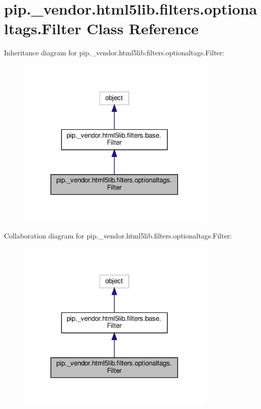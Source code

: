 \hypertarget{classpip_1_1__vendor_1_1html5lib_1_1filters_1_1optionaltags_1_1Filter}{}\section{pip.\+\_\+vendor.\+html5lib.\+filters.\+optionaltags.\+Filter Class Reference}
\label{classpip_1_1__vendor_1_1html5lib_1_1filters_1_1optionaltags_1_1Filter}


Inheritance diagram for pip.\+\_\+vendor.\+html5lib.\+filters.\+optionaltags.\+Filter\+:
\nopagebreak
\begin{figure}[H]
\begin{center}
\leavevmode
\includegraphics[width=269pt]{classpip_1_1__vendor_1_1html5lib_1_1filters_1_1optionaltags_1_1Filter__inherit__graph}
\end{center}
\end{figure}


Collaboration diagram for pip.\+\_\+vendor.\+html5lib.\+filters.\+optionaltags.\+Filter\+:
\nopagebreak
\begin{figure}[H]
\begin{center}
\leavevmode
\includegraphics[width=269pt]{classpip_1_1__vendor_1_1html5lib_1_1filters_1_1optionaltags_1_1Filter__coll__graph}
\end{center}
\end{figure}
